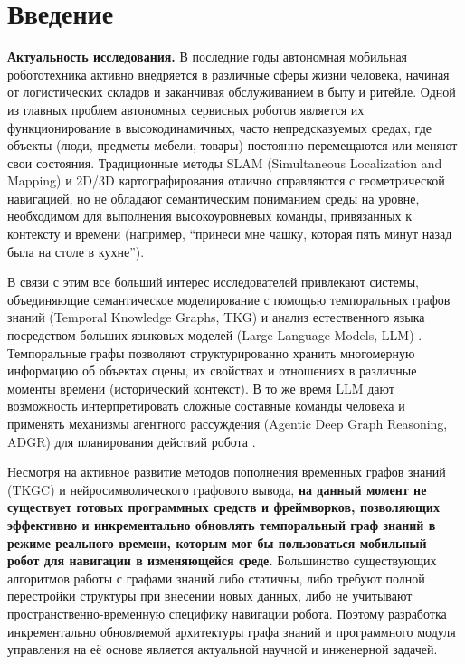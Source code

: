 \chapter*{Введение}

\textbf{Актуальность исследования.} В последние годы автономная мобильная робототехника активно внедряется в различные сферы жизни человека, начиная от логистических складов и заканчивая обслуживанием в быту и ритейле. Одной из главных проблем автономных сервисных роботов является их функционирование в высокодинамичных, часто непредсказуемых средах, где объекты (люди, предметы мебели, товары) постоянно перемещаются или меняют свои состояния. Традиционные методы SLAM (Simultaneous Localization and Mapping) и 2D/3D картографирования отлично справляются с геометрической навигацией, но не обладают семантическим пониманием среды на уровне, необходимом для выполнения высокоуровневых команды, привязанных к контексту и времени (например, ``принеси мне чашку, которая пять минут назад была на столе в кухне'').

В связи с этим все больший интерес исследователей привлекают системы, объединяющие семантическое моделирование с помощью темпоральных графов знаний (Temporal Knowledge Graphs, TKG) и анализ естественного языка посредством больших языковых моделей (Large Language Models, LLM) \cite{ref7}. Темпоральные графы позволяют структурированно хранить многомерную информацию об объектах сцены, их свойствах и отношениях в различные моменты времени (исторический контекст). В то же время LLM дают возможность интерпретировать сложные составные команды человека и применять механизмы агентного рассуждения (Agentic Deep Graph Reasoning, ADGR) для планирования действий робота \cite{ref1, ref19, ref20}.

Несмотря на активное развитие методов пополнения временных графов знаний (TKGC) и нейросимволического графового вывода, \textbf{на данный момент не существует готовых программных средств и фреймворков, позволяющих эффективно и инкрементально обновлять темпоральный граф знаний в режиме реального времени, которым мог бы пользоваться мобильный робот для навигации в изменяющейся среде.} Большинство существующих алгоритмов работы с графами знаний либо статичны, либо требуют полной перестройки структуры при внесении новых данных, либо не учитывают пространственно-временную специфику навигации робота. Поэтому разработка инкрементально обновляемой архитектуры графа знаний и программного модуля управления на её основе является актуальной научной и инженерной задачей.

